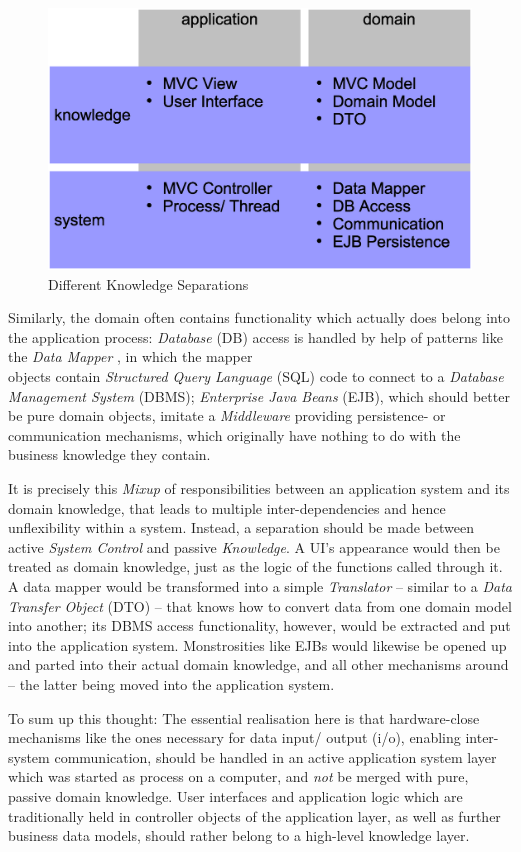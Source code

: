 \begin{figure}[ht]
    \begin{center}
        \includegraphics[scale=0.2]{vector/separation.eps}
        \caption{Different Knowledge Separations}
        \label{separation_figure}
    \end{center}
\end{figure}

Similarly, the domain often contains functionality which actually does belong
into the application process: \emph{Database} (DB) access is handled by help of
patterns like the \emph{Data Mapper} \cite{heller2005}, in which the mapper\\
objects contain \emph{Structured Query Language} (SQL) code to connect to a
\emph{Database Management System} (DBMS); \emph{Enterprise Java Beans} (EJB),
which should better be pure domain objects, imitate a \emph{Middleware}
providing persistence- or communication mechanisms, which originally have
nothing to do with the business knowledge they contain.

It is precisely this \emph{Mixup} of responsibilities between an application
system and its domain knowledge, that leads to multiple inter-dependencies and
hence unflexibility within a system. Instead, a separation should be made
between active \emph{System Control} and passive \emph{Knowledge}. A UI's
appearance would then be treated as domain knowledge, just as the logic of the
functions called through it. A data mapper would be transformed into a simple
\emph{Translator} -- similar to a \emph{Data Transfer Object} (DTO)
\cite{heller2005} -- that knows how to convert data from one domain model into
another; its DBMS access functionality, however, would be extracted and put
into the application system. Monstrosities like EJBs would likewise be opened
up and parted into their actual domain knowledge, and all other mechanisms
around -- the latter being moved into the application system.

To sum up this thought: The essential realisation here is that hardware-close
mechanisms like the ones necessary for data input/ output (i/o), enabling
inter-system communication, should be handled in an active application system
layer which was started as process on a computer, and \emph{not} be merged with
pure, passive domain knowledge. User interfaces and application logic which are
traditionally held in controller objects of the application layer, as well as
further business data models, should rather belong to a high-level knowledge
layer.
